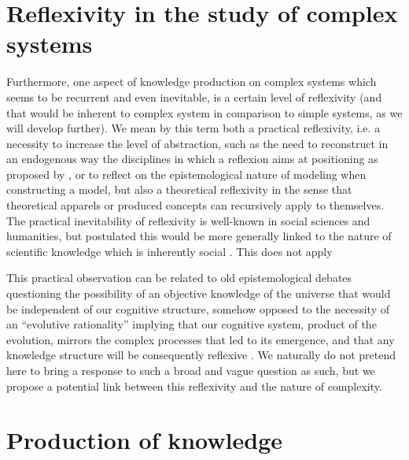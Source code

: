 


\section{Reflexivity in the study of complex systems}



Furthermore, one aspect of knowledge production on complex systems which seems to be recurrent and even inevitable, is a certain level of reflexivity (and that would be inherent to complex system in comparison to simple systems, as we will develop further). We mean by this term both a practical reflexivity, i.e. a necessity to increase the level of abstraction, such as the need to reconstruct in an endogenous way the disciplines in which a reflexion aims at positioning as proposed by \cite{2017arXiv171200805R}, or to reflect on the epistemological nature of modeling when constructing a model, but also a theoretical reflexivity in the sense that theoretical apparels or produced concepts can recursively apply to themselves. The practical inevitability of reflexivity is well-known in social sciences and humanities, but \cite{bourdieu2004science} postulated this would be more generally linked to the nature of scientific knowledge which is inherently social \cite{maton2003reflexivity}. %
This does not apply

This practical observation can be related to old epistemological debates questioning the possibility of an objective knowledge of the universe that would be independent of our cognitive structure, somehow opposed to the necessity of an ``evolutive rationality'' implying that our cognitive system, product of the evolution, mirrors the complex processes that led to its emergence, and that any knowledge structure will be consequently reflexive
. We naturally do not pretend here to bring a response to such a broad and vague question as such, but we propose a potential link between this reflexivity and the nature of complexity. 







\section{Production of knowledge}

